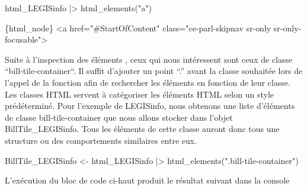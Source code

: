 \documentclass[
  letterpaper,
  DIV=11,
  numbers=noendperiod]{scrreprt}
\newenvironment{Shaded}{\begin{snugshade}}{\end{snugshade}}
\newcommand{\ExtensionTok}[1]{\textcolor[rgb]{0.00,0.23,0.31}{#1}}
\newcommand{\KeywordTok}[1]{\textcolor[rgb]{0.00,0.23,0.31}{#1}}
\newcommand{\NormalTok}[1]{\textcolor[rgb]{0.00,0.23,0.31}{#1}}
\newcommand{\OperatorTok}[1]{\textcolor[rgb]{0.37,0.37,0.37}{#1}}
\newcommand{\StringTok}[1]{\textcolor[rgb]{0.13,0.47,0.30}{#1}}
\newcommand{\VariableTok}[1]{\textcolor[rgb]{0.07,0.07,0.07}{#1}}
\begin{document}
\begin{Shaded}
\begin{Highlighting}[]
\ExtensionTok{html\_LEGISinfo} \KeywordTok{|}\OperatorTok{\textgreater{}}\NormalTok{ html\_elements}\KeywordTok{(}\StringTok{"a"}\KeywordTok{)}
\end{Highlighting}
\end{Shaded}

\begin{Shaded}
\begin{Highlighting}[]
\ExtensionTok{\{html\_node\}}
\OperatorTok{\textless{}}\NormalTok{a }\VariableTok{href}\OperatorTok{=}\StringTok{"\#StartOfContent"} \VariableTok{class}\OperatorTok{=}\StringTok{"ce{-}parl{-}skipnav sr{-}only sr{-}only{-}focusable"}\OperatorTok{\textgreater{}}
\end{Highlighting}
\end{Shaded}

Suite à l'inspection des éléments , ceux qui nous intéressent sont ceux
de classe ``bill-tile-container``. Il suffit d'ajouter un point ``.''
avant la classe souhaitée lors de l'appel de la fonction afin de
rechercher les éléments en fonction de leur classe. Les classes HTML
servent à catégoriser les éléments HTML selon un style prédéterminé.
Pour l'exemple de LEGISinfo, nous obtenons une liste d'éléments de
classe bill-tile-container que nous allons stocker dans l'objet
BillTile\_LEGISinfo. Tous les éléments de cette classe auront donc tous
une structure ou des comportements similaires entre eux.

\begin{Shaded}
\begin{Highlighting}[]
\ExtensionTok{BillTile\_LEGISinfo} \OperatorTok{\textless{}}\NormalTok{{-} html\_LEGISinfo }\KeywordTok{|}\OperatorTok{\textgreater{}}\NormalTok{ html\_elements}\KeywordTok{(}\StringTok{".bill{-}tile{-}container"}\KeywordTok{)}
\end{Highlighting}
\end{Shaded}

L'exécution du bloc de code ci-haut produit le résultat suivant dans la
console
\end{document}
